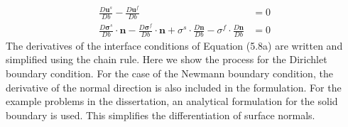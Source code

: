%
%
\begin{subequations}\label{eq:C5_FSIconstraintsSA}
\begin{align}
	\frac{D \mathbf{u}^s}{D b} - 
	\frac{D \mathbf{u}^f}{D b} &= 0
	\\
	\frac{D \mathbf{\sigma}^s}{D b} \cdot \mathbf{n} - 
	\frac{D \mathbf{\sigma}^f}{D b} \cdot \mathbf{n} +
	\sigma^s \cdot \frac{D \mathbf{n}}{D b} - 
	\sigma^f \cdot \frac{D \mathbf{n}}{D b} &= 0
\end{align}
\end{subequations}
%
The derivatives of the interface conditions of Equation (5.8a) are written and simplified using the chain rule. Here we show the process for the Dirichlet boundary condition. For the case of the Newmann boundary condition, the derivative of the normal direction is also included in the formulation. For the example problems in the dissertation, an analytical formulation for the solid boundary is used. This simplifies the differentiation of surface normals.
%

